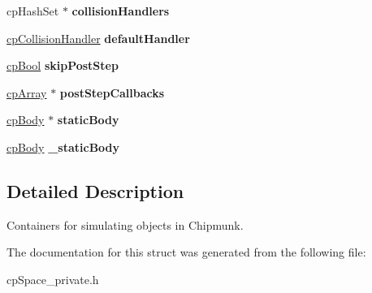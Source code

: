 \begin{DoxyCompactItemize}
\item 
\hypertarget{structcp_space_a4466f8814bfb39de60734d435649b0dd}{}cp\+Hash\+Set $\ast$ {\bfseries collision\+Handlers}\label{structcp_space_a4466f8814bfb39de60734d435649b0dd}

\item 
\hypertarget{structcp_space_a6c58059b9576001c8a18c11fb9b231c4}{}\hyperlink{structcp_collision_handler}{cp\+Collision\+Handler} {\bfseries default\+Handler}\label{structcp_space_a6c58059b9576001c8a18c11fb9b231c4}

\item 
\hypertarget{structcp_space_a4b82b21459a5bee3aaef8df4c3f131fd}{}\hyperlink{group__basic_types_gabc5e752c48f3449ca26ef413ecbd647e}{cp\+Bool} {\bfseries skip\+Post\+Step}\label{structcp_space_a4b82b21459a5bee3aaef8df4c3f131fd}

\item 
\hypertarget{structcp_space_a0d0ff9535b8383c8d09c90eee4ae02a6}{}\hyperlink{structcp_array}{cp\+Array} $\ast$ {\bfseries post\+Step\+Callbacks}\label{structcp_space_a0d0ff9535b8383c8d09c90eee4ae02a6}

\item 
\hypertarget{structcp_space_aa7cb4add8933036493bf7f4ee98ad13e}{}\hyperlink{structcp_body}{cp\+Body} $\ast$ {\bfseries static\+Body}\label{structcp_space_aa7cb4add8933036493bf7f4ee98ad13e}

\item 
\hypertarget{structcp_space_a9ef6a6fa6948d39ec8075af0daa452cd}{}\hyperlink{structcp_body}{cp\+Body} {\bfseries \+\_\+static\+Body}\label{structcp_space_a9ef6a6fa6948d39ec8075af0daa452cd}

\end{DoxyCompactItemize}


\subsection{Detailed Description}
Containers for simulating objects in Chipmunk. 

The documentation for this struct was generated from the following file\+:\begin{DoxyCompactItemize}
\item 
cp\+Space\+\_\+private.\+h\end{DoxyCompactItemize}
